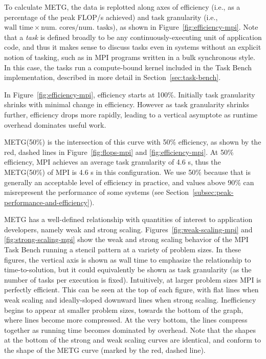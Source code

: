 To calculate METG, the data is replotted along axes of efficiency
(i.e., as a percentage of the peak FLOP/s achieved) and task
granularity (i.e., $\text{wall time} \times \text{num.~cores}/\text{num.~tasks}$), as shown in Figure~\ref{fig:efficiency-mpi}. Note that a \emph{task} is defined
broadly to be any continuously-executing unit of application code,
and thus it makes sense to discuss tasks even in systems
without an explicit notion of tasking, such as in MPI programs written in a bulk synchronous style. In this case, the tasks run a
compute-bound kernel included in the Task Bench implementation,
described in more detail in Section~\ref{sec:task-bench}.

In Figure~\ref{fig:efficiency-mpi},
efficiency starts at 100\%. Initially task granularity
shrinks with minimal change in efficiency. However as task
granularity shrinks further, efficiency drops more rapidly, leading
to a vertical asymptote as runtime overhead dominates useful work.


METG(50\%) is the intersection of this curve with 50\% efficiency, as
shown by the red, dashed lines in Figure~\ref{fig:flops-mpi} and
\ref{fig:efficiency-mpi}. At 50\% efficiency, MPI achieves an average
task granularity of
4.6 \textmu{}s, thus the METG(50\%) of MPI is 4.6 \textmu{}s in this
configuration. We use 50\% because that is generally an acceptable level
of efficiency in practice, and values above 90\% can misrepresent the
performance of some systems (see
Section~\ref{subsec:peak-performance-and-efficiency}).




METG has a well-defined
relationship with quantities of interest to application developers,
namely weak and strong scaling. Figures~\ref{fig:weak-scaling-mpi} and
\ref{fig:strong-scaling-mpi} show the weak and strong scaling behavior of the MPI Task Bench running a stencil pattern at a variety of problem sizes. In these
figures, the vertical axis is shown as wall time to emphasize the
relationship to time-to-solution, but it could equivalently be shown
as task granularity (as the number of tasks per execution is
fixed). Intuitively, at
larger problem sizes MPI is perfectly efficient. This can be seen at
the top of each figure, with flat lines when weak scaling and
ideally-sloped downward lines when strong scaling. Inefficiency begins
to appear at smaller problem sizes, towards the bottom of the graph,
where lines become more compressed. At the
very bottom, the lines compress together as running time becomes
dominated by overhead. Note that the
shapes at the bottom of the strong and weak scaling curves are identical,
and conform to the shape of the METG curve (marked by the red, dashed line).

